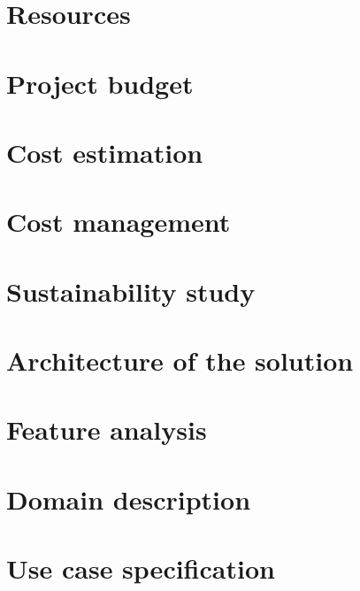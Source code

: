 \documentclass{report}
\begin{document}
    \chapter{Resources}
    
    
    \chapter{Project budget}
    
    
    \chapter{Cost estimation}
    
    
    \chapter{Cost management}
    
    
    \chapter{Sustainability study}
    
    
    \chapter{Architecture of the solution}
    
    
    \chapter{Feature analysis}
    
    
    \chapter{Domain description}
    

    

    \appendix
        \chapter{Use case specification}
        
\end{document}
